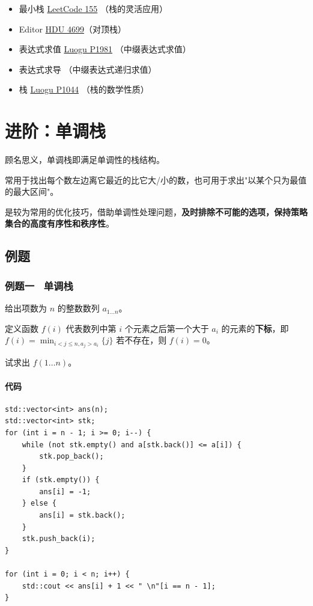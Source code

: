 \documentclass{report}
\begin{document}
\begin{itemize}
    \item 最小栈 \href{https://leetcode.cn/problems/min-stack/}{LeetCode 155} （栈的灵活应用）
    \item Editor \href{https://acm.hdu.edu.cn/showproblem.php?pid=4699}{HDU 4699}（对顶栈）
    \item {} 表达式求值 \href{https://www.luogu.com.cn/problem/P1981}{Luogu P1981} （中缀表达式求值）
    \item {} 表达式求导 （中缀表达式递归求值）
    \item {} 栈 \href{https://www.luogu.com.cn/problem/P1044}{Luogu P1044} （栈的数学性质）
\end{itemize}

\section{进阶：单调栈}

顾名思义，单调栈即满足单调性的栈结构。

常用于找出每个数左边离它最近的比它大/小的数，也可用于求出"以某个只为最值的最大区间"。

是较为常用的优化技巧，借助单调性处理问题，\textbf{及时排除不可能的选项，保持策略集合的高度有序性和秩序性}。

\subsection{例题}

\subsubsection{例题一 \ 单调栈}

给出项数为 $n$ 的整数数列 $a_{1 \dots n}$。

定义函数 $f(i)$ 代表数列中第 $i$ 个元素之后第一个大于 $a_i$ 的元素的\textbf{下标}，即
$f(i)=\min_{i<j\leq n, a_j > a_i} \{j\}$
若不存在，则 $f(i)=0$。

试求出 $f(1\dots n)$。

\paragraph{代码}

\begin{verbatim}
std::vector<int> ans(n);
std::vector<int> stk;
for (int i = n - 1; i >= 0; i--) {
    while (not stk.empty() and a[stk.back()] <= a[i]) {
        stk.pop_back();
    }
    if (stk.empty()) {
        ans[i] = -1;
    } else {
        ans[i] = stk.back();
    }
    stk.push_back(i);
}

for (int i = 0; i < n; i++) {
    std::cout << ans[i] + 1 << " \n"[i == n - 1];
}
\end{verbatim}
\end{document}
